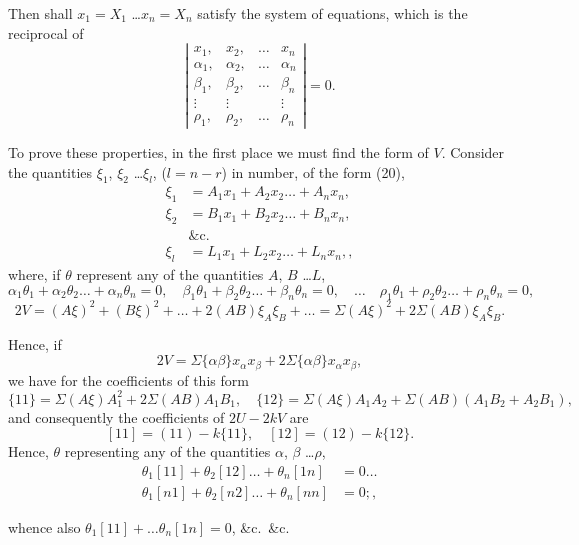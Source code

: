 \documentclass[11pt,a4paper]{article}
\theoremstyle{plain}
\theoremstyle{definition}
\theoremstyle{remark}
\begin{document}
Then shall $x_1 = X_1$ \ldots $x_n = X_n$ satisfy the system of equations, which is the reciprocal of
\[
\left|\begin{array}{cccc}
x_1, & x_2, & \ldots & x_n \\
\alpha_1, & \alpha_2, & \ldots & \alpha_n \\
\beta_1, & \beta_2, & \ldots & \beta_n \\
\vdots & \vdots & & \vdots \\
\rho_1, & \rho_2, & \ldots & \rho_n
\end{array}\right| = 0
\tag{25}.
\]

To prove these properties, in the first place we must find the form of $V$.
Consider the quantities $\xi_1$, $\xi_2$ \ldots $\xi_l$, ($l = n-r$) in number, of the form (20),
\begin{align*}
\xi_1 &= A_1 x_1 + A_2 x_2 \ldots + A_n x_n, \\
\xi_2 &= B_1 x_1 + B_2 x_2 \ldots + B_n x_n, \\
&\text{\&c.} \\
\xi_l &= L_1 x_1 + L_2 x_2 \ldots + L_n x_n,
\tag{27},
\end{align*}
where, if $\theta$ represent any of the quantities $A$, $B$ \ldots $L$,
\[
\alpha_1 \theta_1 + \alpha_2 \theta_2 \ldots + \alpha_n \theta_n = 0, \quad
\beta_1 \theta_1 + \beta_2 \theta_2 \ldots + \beta_n \theta_n = 0, \quad
\ldots \quad
\rho_1 \theta_1 + \rho_2 \theta_2 \ldots + \rho_n \theta_n = 0,
\]
\[
2V = (A\xi)^2 + (B\xi)^2 + \ldots + 2(AB)\xi_A\xi_B + \ldots = \Sigma(A\xi)^2 + 2\Sigma(AB)\xi_A\xi_B.
\]

Hence, if
\[
2V = \Sigma\{\alpha\beta\} x_\alpha x_\beta + 2\Sigma\{\alpha\beta\} x_\alpha x_\beta \tag{28},
\]
we have for the coefficients of this form
\[
\{11\} = \Sigma(A\xi) A_1^2 + 2\Sigma(AB) A_1 B_1, \quad
\{12\} = \Sigma(A\xi) A_1 A_2 + \Sigma(AB) (A_1 B_2 + A_2 B_1),
\]
and consequently the coefficients of $2U - 2kV$ are
\[
[11] = (11) - k\{11\}, \quad [12] = (12) - k\{12\}.
\]
Hence, $\theta$ representing any of the quantities $\alpha$, $\beta$ \ldots $\rho$,
\begin{align*}
\theta_1[11] + \theta_2[12] \ldots + \theta_n[1n] &= 0 \ldots \\
\theta_1[n1] + \theta_2[n2] \ldots + \theta_n[nn] &= 0;
\tag{29},
\end{align*}
\newpage

whence also $\theta_1[11] + \ldots \theta_n[1n] = 0$, \&c.\ \&c.
\end{document}
